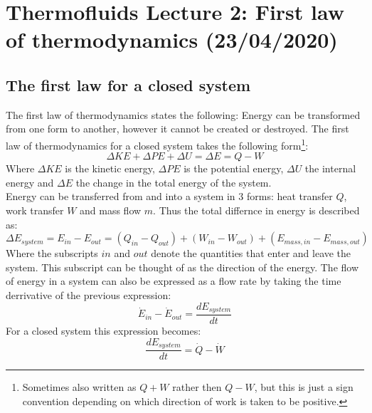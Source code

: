 \documentclass[11pt, a4paper]{article}
\begin{document}
\setcounter{section}{1}
\setcounter{equation}{0}

\section{Thermofluids Lecture 2: First law of thermodynamics (23/04/2020)}


\subsection{The first law for a closed system}
The first law of thermodynamics states the following: Energy can be transformed from one form to another, however it cannot be created or destroyed. The first law of thermodynamics for a closed system takes the following form\footnote{Sometimes also written as $Q + W$ rather then $Q - W$, but this is just a sign convention depending on which direction of work is taken to be positive.}:
\begin{equation}
  \Delta KE + \Delta PE + \Delta U = \Delta E = Q - W
\end{equation}
Where $\Delta KE$ is the kinetic energy, $\Delta PE$ is the potential energy, $\Delta U$ the internal energy and $\Delta E$ the change in the total energy of the system.\\
Energy can be transferred from and into a system in 3 forms: heat transfer $Q$, work transfer $W$ and mass flow $m$. Thus the total differnce in energy is described as:
\begin{equation}
  \Delta E_{system} = E_{in} - E_{out} = (Q_{in} - Q_{out}) + (W_{in} - W_{out}) + (E_{mass,in} - E_{mass,out})
\end{equation}
Where the subscripts $in$ and $out$ denote the quantities that enter and leave the system. This subscript can be thought of as the direction of the energy. The flow of energy in a system can also be expressed as a flow rate by taking the time derrivative of the previous expression:
\begin{equation}
  \dot{E}_{in} - \dot{E}_{out} = \frac{dE_{system}}{dt}
\end{equation}
For a closed system this expression becomes:
\begin{equation}
  \frac{dE_{system}}{dt} = \dot{Q} - \dot{W}
\end{equation}
\end{document}
